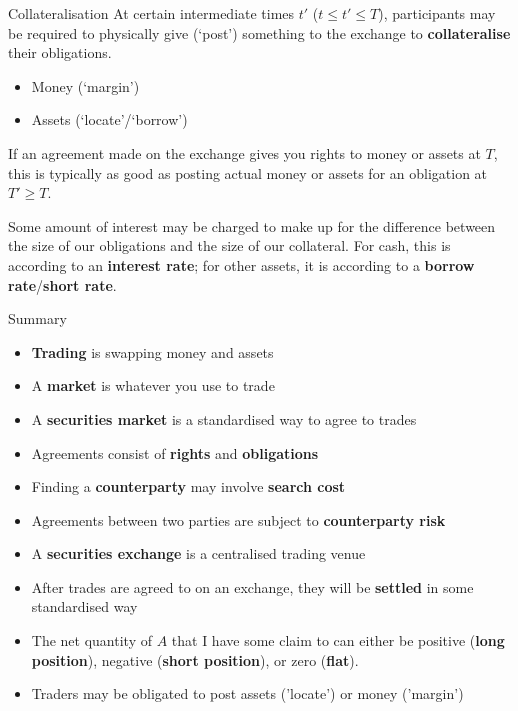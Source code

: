 \documentclass{beamer}
\begin{document}
\begin{frame}{Collateralisation}
	At certain intermediate times $t'$ ($t\leq t'\leq T$), participants may be required to physically give (`post') something to the exchange to \textbf{collateralise} their obligations.
	\begin{itemize}
		\item Money (`margin') %
		\item Assets (`locate'/`borrow') %
	\end{itemize}
	If an agreement made on the exchange gives you rights to money or assets at $T$, this is typically as good as posting actual money or assets for an obligation at $T'\geq T$.

	Some amount of interest may be charged to make up for the difference between the size of our obligations and the size of our collateral. For cash, this is according to an \textbf{interest rate}; for other assets, it is according to a \textbf{borrow rate}/\textbf{short rate}.
\end{frame}

\begin{frame}{Summary}
	\begin{itemize}
		\item \textbf{Trading} is swapping money and assets
		\item A \textbf{market} is whatever you use to trade
		\item A \textbf{securities market} is a standardised way to agree to trades
		\item Agreements consist of \textbf{rights} and \textbf{obligations}
		\item Finding a \textbf{counterparty} may involve \textbf{search cost}
		\item Agreements between two parties are subject to \textbf{counterparty risk}
		\item A \textbf{securities exchange} is a centralised trading venue %
		\item After trades are agreed to on an exchange, they will be \textbf{settled} in some standardised way
		\item The net quantity of $A$ that I have some claim to can either be positive (\textbf{long position}), negative (\textbf{short position}), or zero (\textbf{flat}).
		\item Traders may be obligated to post assets ('locate') or money ('margin')
	\end{itemize}
\end{frame}
\end{document}
